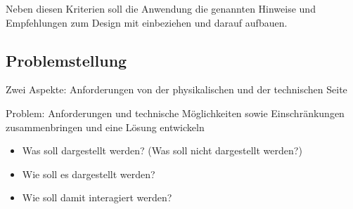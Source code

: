 Neben diesen Kriterien soll die Anwendung die genannten Hinweise und Empfehlungen zum Design mit einbeziehen und darauf aufbauen.

\subsection{Problemstellung}
\label{sec-3-2}
Zwei Aspekte: Anforderungen von der physikalischen und der technischen Seite

Problem: Anforderungen und technische Möglichkeiten sowie Einschränkungen zusammenbringen und eine Lösung entwickeln
\begin{itemize}
	\item Was soll dargestellt werden? (Was soll nicht dargestellt werden?)
	\item Wie soll es dargestellt werden?
	\item Wie soll damit interagiert werden?
\end{itemize}


